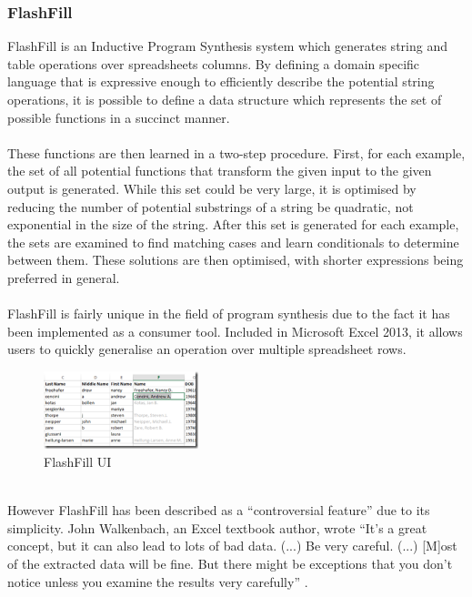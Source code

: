\subsubsection{FlashFill}
FlashFill \cite{Gulwani2012} is an Inductive Program Synthesis system which generates string and table operations over spreadsheets columns. By defining a domain specific language that is expressive enough to efficiently describe the potential string operations, it is possible to define a data structure which represents the set of possible functions in a succinct manner. \\ \\
These functions are then learned in a two-step procedure. First, for each example, the set of all potential functions that transform the given input to the given output is generated. While this set could be very large, it is optimised by reducing the number of potential substrings of a string be quadratic, not exponential in the size of the string. After this set is generated for each example, the sets are examined to find matching cases and learn conditionals to determine between them. These solutions are then optimised, with shorter expressions being preferred in general.\\ \\
FlashFill is fairly unique in the field of program synthesis due to the fact it has been implemented as a consumer tool. Included in Microsoft Excel 2013, it allows users to quickly generalise an operation over multiple spreadsheet rows.

\begin{figure}[h!]
\centering
\includegraphics[width=0.4\textwidth]{C2/flash_fill.png}
\caption{FlashFill UI}
\label{fig:flashfill}
\end{figure}
\mbox{}\\
However FlashFill has been described as a ``controversial feature'' due to its simplicity. John Walkenbach, an Excel textbook author, wrote ``It's a great concept, but it can also lead to lots of bad data. (...) Be very careful. (...) [M]ost of the extracted data will be fine. But there might be exceptions that you don't notice unless you examine the results very carefully'' \cite{Bauer2016}.

%
%

\pagebreak